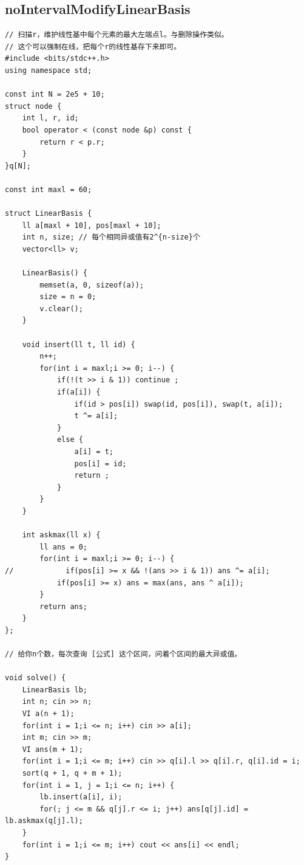 \documentclass[twoside]{article}
\begin{document}
\subsection{noIntervalModifyLinearBasis}
\begin{lstlisting}
// 扫描r，维护线性基中每个元素的最大左端点l。与删除操作类似。
// 这个可以强制在线，把每个r的线性基存下来即可。
#include <bits/stdc++.h>
using namespace std;

const int N = 2e5 + 10;
struct node {
    int l, r, id;
    bool operator < (const node &p) const {
        return r < p.r;
    }
}q[N];

const int maxl = 60;

struct LinearBasis {
    ll a[maxl + 10], pos[maxl + 10];
    int n, size; // 每个相同异或值有2^{n-size}个
    vector<ll> v;

    LinearBasis() {
        memset(a, 0, sizeof(a));
        size = n = 0;
        v.clear();
    }

    void insert(ll t, ll id) {
        n++;
        for(int i = maxl;i >= 0; i--) {
            if(!(t >> i & 1)) continue ;
            if(a[i]) {
                if(id > pos[i]) swap(id, pos[i]), swap(t, a[i]);
                t ^= a[i];
            }
            else {
                a[i] = t;
                pos[i] = id;
                return ;
            }
        }
    }

    int askmax(ll x) {
        ll ans = 0;
        for(int i = maxl;i >= 0; i--) {
//            if(pos[i] >= x && !(ans >> i & 1)) ans ^= a[i];
            if(pos[i] >= x) ans = max(ans, ans ^ a[i]);
        }
        return ans;
    }
};

// 给你n个数，每次查询 [公式] 这个区间，问着个区间的最大异或值。

void solve() {
    LinearBasis lb;
    int n; cin >> n;
    VI a(n + 1);
    for(int i = 1;i <= n; i++) cin >> a[i];
    int m; cin >> m;
    VI ans(m + 1);
    for(int i = 1;i <= m; i++) cin >> q[i].l >> q[i].r, q[i].id = i;
    sort(q + 1, q + m + 1);
    for(int i = 1, j = 1;i <= n; i++) {
        lb.insert(a[i], i);
        for(; j <= m && q[j].r <= i; j++) ans[q[j].id] = lb.askmax(q[j].l);
    }
    for(int i = 1;i <= m; i++) cout << ans[i] << endl;
}
\end{lstlisting}
\end{document}
